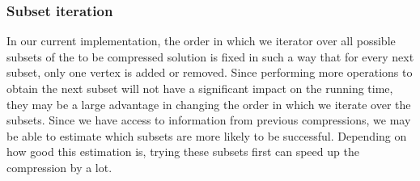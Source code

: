 \subsubsection{Subset iteration}
In our current implementation, the order in which we iterator over all possible subsets
of the to be compressed solution is fixed in such a way that for every next subset, only one vertex is added or removed.
Since performing more operations to obtain the next subset will not have a significant impact on the running time, they
may be a large advantage in changing the order in which we iterate over the subsets. Since we have access to information
from previous compressions, we may be able to estimate which subsets are more likely to be successful. Depending on how
good this estimation is, trying these subsets first can speed up the compression by a lot.
